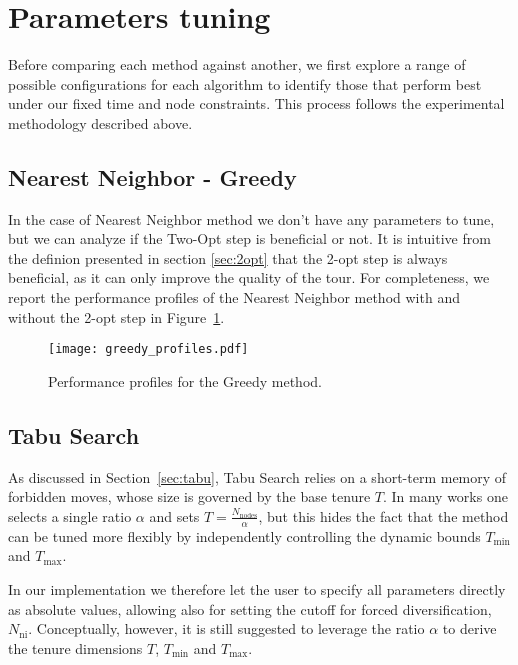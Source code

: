 \section{Parameters tuning}

Before comparing each method against another, we first explore a range of possible configurations for each algorithm to identify those that perform best under our fixed time and node constraints. This process follows the experimental methodology described above.

\subsection{Nearest Neighbor - Greedy}
\label{ssec:nn-tuning}

In the case of Nearest Neighbor method we don't have any parameters to tune, but we can analyze if the Two-Opt step is beneficial or not. It is intuitive from the definion presented in section \ref{sec:2opt} that the 2-opt step is always beneficial, as it can only improve the quality of the tour. For completeness, we report the performance profiles of the Nearest Neighbor method with and without the 2-opt step in Figure~\ref{fig:nn-profiles}.

\begin{figure}[H]
  \centering
  \texttt{[image: greedy\_profiles.pdf]}
  \caption{Performance profiles for the Greedy method.}
  \label{fig:nn-profiles}
\end{figure}

\subsection{Tabu Search}
\label{ssec:tabu-tuning}
As discussed in Section~\ref{sec:tabu}, Tabu Search relies on a short-term memory of forbidden moves, whose size is governed by the base tenure \(T\).  In many works one selects a single ratio \(\alpha\) and sets \(T=\frac{N_{\mathrm{nodes}}}{\alpha}\), but this hides the fact that the method can be tuned more flexibly by independently controlling the dynamic bounds \(T_{\min}\) and \(T_{\max}\).

In our implementation we therefore let the user to specify all parameters directly as absolute values, allowing also for setting the cutoff for forced diversification, \(N_{\mathrm{ni}}\). Conceptually, however, it is still suggested to leverage the ratio \(\alpha\) to derive the tenure dimensions \(T\), \(T_{\min}\) and \(T_{\max}\).

